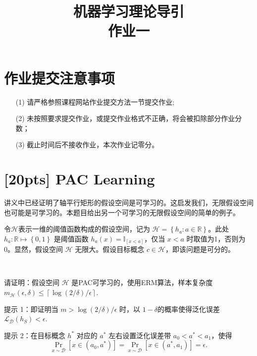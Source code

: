 \documentclass[a4paper,UTF8]{article}
\numberwithin{equation}{section}
\begin{document}
	\renewcommand{\tilde}{\widetilde}
	\renewcommand{\hat}{\widehat}
	
\title{机器学习理论导引\\
作业一}
\author{}
\maketitle


\section*{作业提交注意事项}
\begin{tcolorbox}
\begin{enumerate}
  \item[(1)] 请严格参照课程网站作业提交方法一节提交作业;
  \item[(2)] 未按照要求提交作业，或提交作业格式不正确，将会被扣除部分作业分数；
  \item[(3)] 截止时间后不接收作业，本次作业记零分。
\end{enumerate}
\end{tcolorbox}

\newpage

\section{[20pts] PAC Learning}

讲义中已经证明了轴平行矩形的假设空间是可学习的。这启发我们，无限假设空间也可能是可学习的。本题目给出另一个可学习的无限假设空间的简单的例子。

令$\mathcal{H}$表示一维的阈值函数构成的假设空间，记为 $\mathcal{H} = \left\lbrace h_a: a\in \mathbb{R} \right\rbrace $。此处 $h_a: \mathbb{R} \mapsto \left\lbrace 0,1 \right\rbrace $ 是阈值函数 $h_a(x) = \mathbb{I}_{[x<a]}$，仅当 $x < a$ 时取值为1，否则为0。显然，假设空间 $\mathcal{H}$ 无限大。假设目标概念 $c \in \mathcal{H}$，即该问题是可分的。

\ 

\noindent 请证明：假设空间 $\mathcal{H}$ 是PAC可学习的，使用ERM算法，样本复杂度 $m_{\mathcal{H}} (\epsilon, \delta) \leq \left \lceil \log (2/\delta)/\epsilon \right \rceil $.

\noindent 提示 1：即证明当 $m > \log (2/\delta)/\epsilon$ 时，以 $1-\delta$的概率使得泛化误差 $\mathcal{L}_{\mathcal{D}} (h_S) < \epsilon $.

\noindent 提示 2：在目标概念 $h^*$ 对应的 $a^*$ 左右设置泛化误差带 $a_0 < a^* < a_1$，使得
$$\Pr_{x \sim \mathcal{D}} \left[ x \in (a_0, a^*) \right]  = \Pr_{x \sim \mathcal{D}} \left[ x \in (a^*, a_1) \right] = \epsilon .$$
\end{document}
